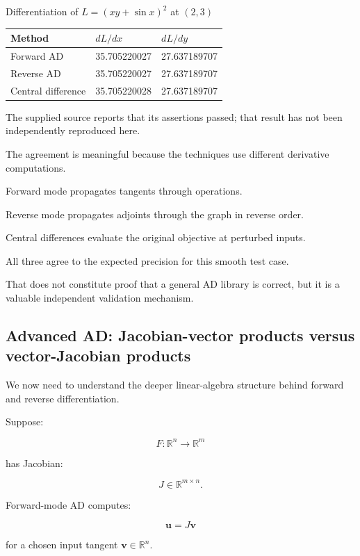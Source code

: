 Differentiation of \(L=(xy+\sin x)^2\) at \((2,3)\)

{\def\LTcaptype{none} %
\begin{longtable}[]{@{}lll@{}}
\toprule\noalign{}
Method & \(dL/dx\) & \(dL/dy\) \\
\midrule\noalign{}
\endhead
\bottomrule\noalign{}
\endlastfoot
Forward AD & 35.705220027 & 27.637189707 \\
Reverse AD & 35.705220027 & 27.637189707 \\
Central difference & 35.705220028 & 27.637189707 \\
\end{longtable}
}

The supplied source reports that its assertions passed; that result has not been independently reproduced here.

The agreement is meaningful because the techniques use different derivative computations.

Forward mode propagates tangents through operations.

Reverse mode propagates adjoints through the graph in reverse order.

Central differences evaluate the original objective at perturbed inputs.

All three agree to the expected precision for this smooth test case.

That does not constitute proof that a general AD library is correct, but it is a valuable independent validation mechanism.

\subsection{Advanced AD: Jacobian-vector products versus vector-Jacobian products}\label{02-foundations-ii-ch022-advanced-ad-jacobian-vector-products-versus-vector-jacobian-products}

We now need to understand the deeper linear-algebra structure behind forward and reverse differentiation.

Suppose:

\[
F:\mathbb R^n\rightarrow\mathbb R^m
\]

has Jacobian:

\[
J\in\mathbb R^{m\times n}.
\]

Forward-mode AD computes:

\[
\boxed{\mathbf u=J\mathbf v}
\]

for a chosen input tangent \(\mathbf v\in\mathbb R^n\).

